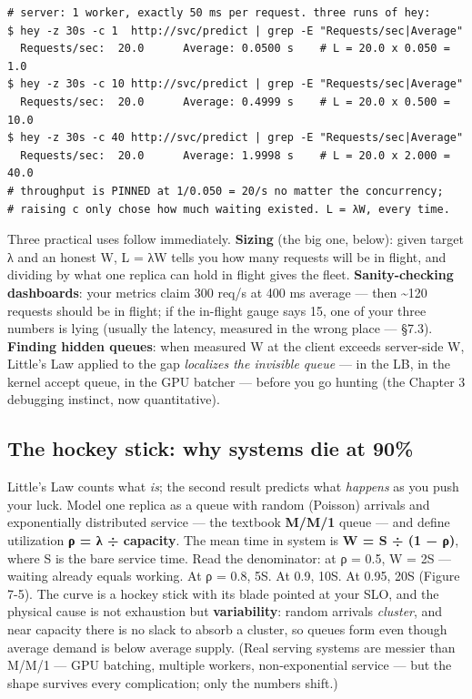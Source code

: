 \begin{terminalbox}
\begin{Verbatim}[breaklines=true,breakanywhere=true,fontsize=\small,formatcom=\color{tbbtermfg},codes=\tbbcodeactive]
# server: 1 worker, exactly 50 ms per request. three runs of hey:
$ hey -z 30s -c 1  http://svc/predict | grep -E "Requests/sec|Average"
  Requests/sec:  20.0      Average: 0.0500 s    # L = 20.0 x 0.050 =  1.0
$ hey -z 30s -c 10 http://svc/predict | grep -E "Requests/sec|Average"
  Requests/sec:  20.0      Average: 0.4999 s    # L = 20.0 x 0.500 = 10.0
$ hey -z 30s -c 40 http://svc/predict | grep -E "Requests/sec|Average"
  Requests/sec:  20.0      Average: 1.9998 s    # L = 20.0 x 2.000 = 40.0
# throughput is PINNED at 1/0.050 = 20/s no matter the concurrency;
# raising c only chose how much waiting existed. L = λW, every time.
\end{Verbatim}
\end{terminalbox}

Three practical uses follow immediately. \textbf{Sizing} (the big one, below): given target λ and an honest W, L = λW tells you how many requests will be in flight, and dividing by what one replica can hold in flight gives the fleet. \textbf{Sanity-checking dashboards}: your metrics claim 300 req/s at 400 ms average — then \textasciitilde{}120 requests should be in flight; if the in-flight gauge says 15, one of your three numbers is lying (usually the latency, measured in the wrong place — §7.3). \textbf{Finding hidden queues}: when measured W at the client exceeds server-side W, Little's Law applied to the gap \textit{localizes the invisible queue} — in the LB, in the kernel accept queue, in the GPU batcher — before you go hunting (the Chapter 3 debugging instinct, now quantitative).

\subsection*{The hockey stick: why systems die at 90\%}

Little's Law counts what \textit{is}; the second result predicts what \textit{happens} as you push your luck. Model one replica as a queue with random (Poisson) arrivals and exponentially distributed service — the textbook \textbf{M/M/1} queue — and define utilization \textbf{ρ = λ ÷ capacity}. The mean time in system is \textbf{W = S ÷ (1 − ρ)}, where S is the bare service time. Read the denominator: at ρ = 0.5, W = 2S — waiting already equals working. At ρ = 0.8, 5S. At 0.9, 10S. At 0.95, 20S (Figure 7-5). The curve is a hockey stick with its blade pointed at your SLO, and the physical cause is not exhaustion but \textbf{variability}: random arrivals \textit{cluster}, and near capacity there is no slack to absorb a cluster, so queues form even though average demand is below average supply. (Real serving systems are messier than M/M/1 — GPU batching, multiple workers, non-exponential service — but the shape survives every complication; only the numbers shift.)

